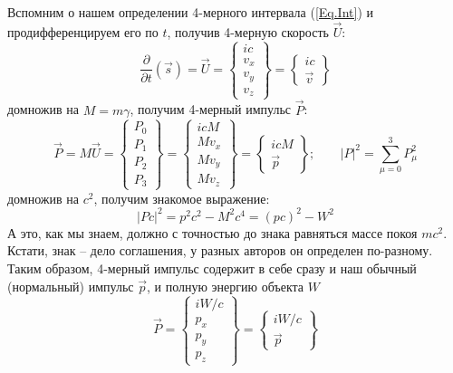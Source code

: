 \documentclass[12pt,epsfig,color,russian]{article}
\begin{document}
Вспомним о нашем определении 4-мерного интервала (\ref{Eq.Int}) и продиф\-фе\-рен\-ци\-руем его по $t$, получив 4-мерную скорость $\vec{U}$:
\begin{equation}
\frac{\partial}{\partial t}(\vec{s}) = \vec{U}=\left\{
\begin{array}{c}
ic\\ v_x\\ v_y\\ v_z
\end{array}
\right\}=\left\{
\begin{array}{c}
ic\\ \vec{v}
\end{array}
\right\}
\end{equation}
домножив на $M=m\gamma$, получим 4-мерный импульс $\vec{P}$:
\begin{equation}\label{Eq.4p}
 \vec{P}=M\vec{U}=\left\{\begin{array}{c}
                 P_0\\ P_1\\ P_2\\ P_3
                \end{array}\right\}=
\left\{\begin{array}{c}
                 icM\\ Mv_x\\ Mv_y\\ Mv_z
                \end{array}\right\}
=\left\{
\begin{array}{c}
icM\\ \vec{p}
\end{array}
\right\}
;\;\;\;\;\;\;\;|P|^2 = \sum_{\mu=0}^3P_\mu^2
\end{equation}
домножив на $c^2$, получим знакомое выражение:
\begin{equation}
|Pc|^2=p^2c^2-M^2c^4=(pc)^2-W^2
\end{equation}
А это, как мы знаем, должно с точностью до знака равняться массе покоя $mc^2$.
Кстати, знак -- дело соглашения, у разных авторов он определен по-разному.
Таким образом, 4-мерный импульс содержит в себе сразу и наш обычный (нормальный) импульс $\vec{p}$, и полную энергию объекта $W$
\begin{displaymath}
 \vec{P}=
\left\{\begin{array}{c}
                 iW/c\\ p_x\\ p_y\\ p_z
                \end{array}\right\}
=\left\{
\begin{array}{c}
iW/c\\ \vec{p}
\end{array}
\right\}
\end{displaymath}
\end{document}
